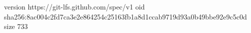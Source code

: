 version https://git-lfs.github.com/spec/v1
oid sha256:8ac004c2fd7ca3e2e864254c25163fb1a8d1ccab9719d93a0b49bbe92e9c5c0d
size 733

